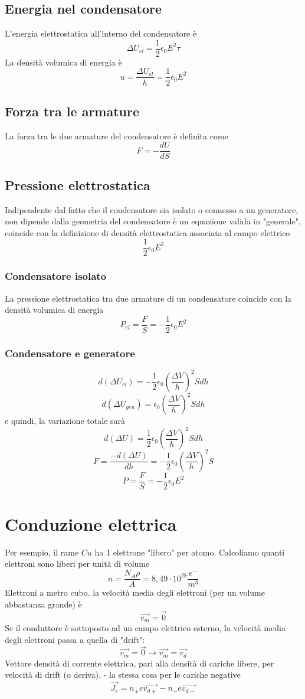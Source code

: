\documentclass[a4paper]{report}
\begin{document}
  \subsection{Energia nel condensatore}
  L'energia elettrostatica all'interno del condensatore è
  \[ \Delta U_{el} = \frac{1}{2} \epsilon_0 E^2 \tau \]
  La densità volumica di energia è
  \[ u = \frac{\Delta U_{el}}{h} = \frac{1}{2} \epsilon_0 E^2 \]

  \subsection{Forza tra le armature}
  La forza tra le due armature del condensatore è definita come
  \[ F = -\frac{dU}{dS} \]

  \subsection{Pressione elettrostatica}
  Indipendente dal fatto che il condensatore sia isolato o connesso a un generatore, non dipende dalla geometria del condensatore è un equazione valida in "generale", coincide con la definizione di densità elettrostatica associata al campo elettrico
  \[ \frac{1}{2} \epsilon_0 E^2 \]

  \subsubsection{Condensatore isolato}
  La pressione elettrostatica tra due armature di un condensatore coincide con la densità volumica di energia
  \[ P_{el} = \frac{F}{S} = -\frac{1}{2} \epsilon_0 E^2 \]

  \subsubsection{Condensatore e generatore}
  \[ d(\Delta U_{el}) = -\frac{1}{2} \epsilon_0 (\frac{\Delta V}{h})^2 S dh \]
  \[ d(\Delta U_{gen}) = \epsilon_0 (\frac{\Delta V}{h})^2 S dh \]
  e quindi, la variazione totale sarà
  \[ d(\Delta U) =\frac{1}{2} \epsilon_0 (\frac{\Delta V}{h})^2 S dh \]
  \[ F = \frac{-d(\Delta U)}{dh} = -\frac{1}{2} \epsilon_0 (\frac{\Delta V}{h})^2 S \]
  \[ P = \frac{F}{S} = -\frac{1}{2} \epsilon_0 E^2 \]

  \section{Conduzione elettrica}
  Per esempio, il rame $Cu$ ha 1 elettrone "libero" per atomo. Calcoliamo quanti elettroni sono liberi per unità di volume
  \[ n = \frac{N_A \rho}{ A} = 8,49 \cdot 10^{28} \frac{e^-}{m^3} \]
  Elettroni a metro cubo. la velocità media degli elettroni (per un volume abbastanza grande) è
  \[\vec{v_m} = \vec{0}\]
  Se il conduttore è sottoposto ad un campo elettrico esterno, la velocità media degli elettroni passa a quella di "drift":
  \[ \vec{v_m} = \vec{0} \longrightarrow \vec{v_m} = \vec{v_d} \]
  Vettore densità di corrente elettrica, pari alla densità di cariche libere, per velocità di drift (o deriva), - la stessa cosa per le cariche negative
  \[ \vec{J_e} = n_+ e \vec{v_{d+}} - n_- e \vec{v_{d-}}\]
\end{document}
